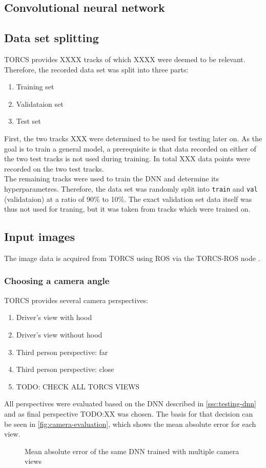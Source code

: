 \documentclass[10pt,a4paper,twoside,journal]{IEEEtran}
\begin{document}
\subsection{Convolutional neural network}

\subsection{Data set splitting}
\label{ssc:data-set-split}
TORCS provides XXXX tracks of which XXXX were deemed to be relevant. Therefore, the recorded data set was split into three parts: 
\begin{enumerate}
	\item Training set
	\item Validataion set
	\item Test set
\end{enumerate}
First, the two tracks XXX were determined to be used for testing later on. As the goal is to train a general model, a prerequisite is that data recorded on either of the two test tracks is not used during training. In total XXX data points were recorded on the two test tracks. \\
The remaining tracks were used to train the DNN and determine its hyperparametres. Therefore, the data set was randomly split into \texttt{train} and \texttt{val} (validataion) at a ratio of 90\% to 10\%. The exact validation set data itself was thus not used for traning, but it was taken from tracks which were trained on.

\subsection{Input images}
The image data is acquired from TORCS \cite{TORCS} using ROS via the TORCS-ROS node \cite{mirus_torcs-ros_2017}. 

\subsubsection{Choosing a camera angle}
TORCS provides several camera perspectives: 
\begin{enumerate}
	\item Driver's view with hood
	\item Driver's view without hood
	\item Third person perspective: far
	\item Third person perspective: close
	\item TODO: CHECK ALL TORCS VIEWS
\end{enumerate}
All perspectives were evaluated based on the DNN described in \autoref{ssc:testing-dnn} 
and as final perspective TODO:XX was chosen. The basis for that decision can be seen in 
\autoref{fig:camera-evaluation}, which shows the mean absolute error for each view.
\begin{figure}
	\centering
	\fbox{\rule{0pt}{2cm} \rule{1.0\linewidth}{0pt}}
	\caption{Mean absolute error of the same DNN trained with multiple camera views}
	\label{fig:camera-evaluation}
\end{figure}
\end{document}

